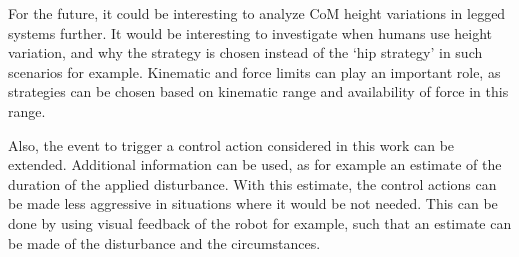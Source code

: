 For the future, it could be interesting to analyze \ac{CoM} height variations in legged systems further. It would be interesting to investigate when humans use height variation, and why the strategy is chosen instead of the `hip strategy' in such scenarios for example. Kinematic and force limits can play an important role, as strategies can be chosen based on kinematic range and availability of force in this range.

Also, the event to trigger a control action considered in this work can be extended. Additional information can be used, as for example an estimate of the duration of the applied disturbance. With this estimate, the control actions can be made less aggressive in situations where it would be not needed. This can be done by using visual feedback of the robot for example, such that an estimate can be made of the disturbance and the circumstances. 
